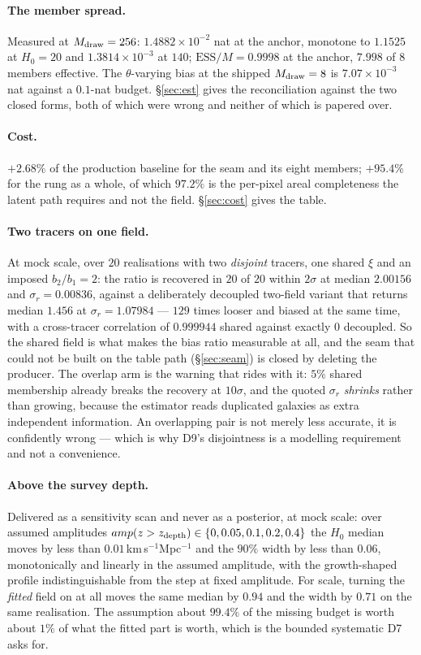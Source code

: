 \documentclass[11pt]{article}
\theoremstyle{definition}
\theoremstyle{remark}
\newcommand{\zdep}{z_{\rm depth}}
\newcommand{\Mdraw}{M_{\rm draw}}
\newcommand{\ESS}{\mathrm{ESS}}
\begin{document}
\paragraph{The member spread.} Measured at $\Mdraw=256$: $1.4882\times10^{-2}$
nat at the anchor, monotone to $1.1525$ at $H_0=20$ and $1.3814\times10^{-3}$ at
$140$; $\ESS/M=0.9998$ at the anchor, $7.998$ of $8$ members effective. The
$\theta$-varying bias at the shipped $\Mdraw=8$ is $7.07\times10^{-3}$ nat
against a $0.1$-nat budget. \S\ref{sec:est} gives the reconciliation against the
two closed forms, both of which were wrong and neither of which is papered over.

\paragraph{Cost.} $+2.68\%$ of the production baseline for the seam and its eight
members; $+95.4\%$ for the rung as a whole, of which $97.2\%$ is the per-pixel
areal completeness the latent path requires and not the field. \S\ref{sec:cost}
gives the table.

\paragraph{Two tracers on one field.} At mock scale, over $20$ realisations with
two \emph{disjoint} tracers, one shared $\xi$ and an imposed $b_2/b_1=2$: the
ratio is recovered in $20$ of $20$ within $2\sigma$ at median $2.00156$ and
$\sigma_r=0.00836$, against a deliberately decoupled two-field variant that
returns median $1.456$ at $\sigma_r=1.07984$ --- $129$ times looser and biased at
the same time, with a cross-tracer correlation of $0.999944$ shared against
exactly $0$ decoupled. So the shared field is what makes the bias ratio
measurable at all, and the seam that could not be built on the table path
(\S\ref{sec:seam}) is closed by deleting the producer. The overlap arm is the
warning that rides with it: $5\%$ shared membership already breaks the recovery
at $10\sigma$, and the quoted $\sigma_r$ \emph{shrinks} rather than growing,
because the estimator reads duplicated galaxies as extra independent information.
An overlapping pair is not merely less accurate, it is confidently wrong ---
which is why D9's disjointness is a modelling requirement and not a convenience.

\paragraph{Above the survey depth.} Delivered as a sensitivity scan and never as
a posterior, at mock scale: over assumed amplitudes $amp(z>\zdep)\in\{0, 0.05,
0.1, 0.2, 0.4\}$ the $H_0$ median moves by less than $0.01$\,km\,s$^{-1}$Mpc$^{-1}$
and the $90\%$ width by less than $0.06$, monotonically and linearly in the
assumed amplitude, with the growth-shaped profile indistinguishable from the step
at fixed amplitude. For scale, turning the \emph{fitted} field on at all moves the
same median by $0.94$ and the width by $0.71$ on the same realisation. The
assumption about $99.4\%$ of the missing budget is worth about $1\%$ of what the
fitted part is worth, which is the bounded systematic D7 asks for.
\end{document}
